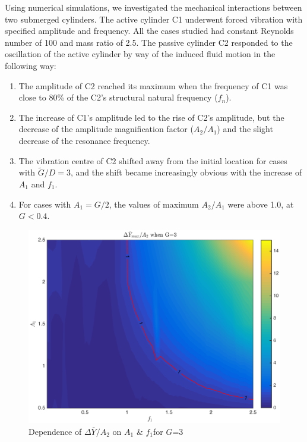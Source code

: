 Using numerical simulations, we investigated the mechanical interactions between two submerged cylinders. The active cylinder C1 underwent forced vibration with specified amplitude and frequency. All the cases studied had constant Reynolds number of 100 and mass ratio of 2.5. The passive cylinder C2 responded to the oscillation of the active cylinder by way of the induced fluid motion in the following way: 
\begin{enumerate}
	\item The amplitude of C2 reached its maximum when the frequency of C1 was close to 80\% of the C2's structural natural frequency ($ f_n $). 
	\item The increase of C1's amplitude led to the rise of C2's amplitude, but the decrease of the amplitude magnification factor ($ A_2/A_1 $) and the slight decrease of the resonance frequency.
	\item The vibration centre of C2 shifted away from the initial location for cases with $ \widetilde{G}/D=3 $, and the shift became increasingly obvious with the increase of $ A_1 $ and $ f_1 $.
	\item For cases with $ A_1=G/2 $, the values of maximum $ A_2/A_1 $ were above 1.0, at $ G<0.4 $.
\end{enumerate}
\begin{figure}[tbp]
	\centering
	\includegraphics[width=0.85\linewidth]{Figs/Contour_deltaY_divided_by_A2_G_is_3}
	\caption{
		Dependence of $\Delta\overline{Y}/A_2$ on $A_1$ \& $f_1 $for $ G $=3
	}
	\label{fig:contourdeltaydividedbya2gis3}
\end{figure}


